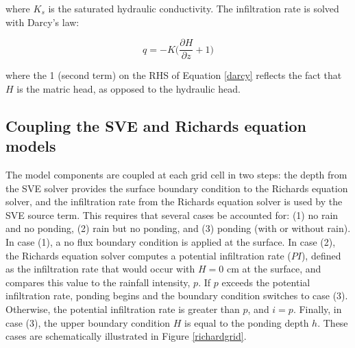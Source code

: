 \documentclass{article}
\begin{document}
where $K_s$ is the saturated hydraulic conductivity.
The infiltration rate is solved with Darcy's law:

\begin{equation}
q =-  K \bigg(\dfrac{\partial H}{\partial z} + 1\bigg)
\label{darcy}
\end{equation}

where the 1  (second term) on the RHS of Equation \ref{darcy} reflects the fact that $H$ is the matric head, as opposed to the hydraulic head.

%
% 

\subsection{Coupling the SVE and Richards equation models}

The model components are coupled at each grid cell in two steps: the depth from the SVE solver provides the surface boundary condition to the Richards equation solver, and the infiltration rate from the Richards equation solver is used by the SVE source term. This requires that several cases be accounted for: (1) no rain and no ponding, (2) rain but no ponding, and (3)  ponding (with or without rain).   In case (1), a no flux boundary condition is applied at the surface.
 In case (2), the Richards equation solver computes a potential infiltration rate ($PI$), defined as the infiltration rate that would occur with $H=0
 $ cm at the surface, and compares this value to the rainfall intensity, $p$.  If $p$ exceeds the potential infiltration rate, ponding begins and the  boundary condition switches to case (3).  Otherwise, the potential infiltration rate is greater than $p$, and $i=p$. Finally, in case (3), the upper boundary condition $H$ is equal to the ponding depth $h$.  These cases are schematically illustrated in Figure \ref{richardgrid}.
 
\end{document}
